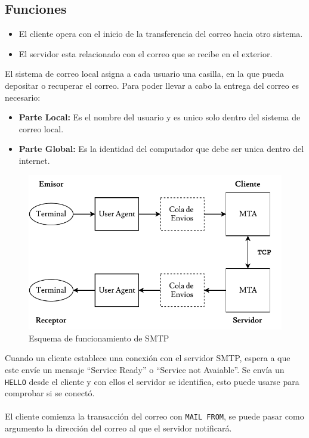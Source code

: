 \subsection*{Funciones}
\begin{itemize}
\item El cliente opera con el inicio de la transferencia del correo hacia otro sistema.
\item El servidor esta relacionado con el correo que se recibe en el exterior.
\end{itemize}
El sistema de correo local asigna a cada usuario una casilla, en la que pueda depositar o recuperar el correo. Para poder llevar a cabo la entrega del correo es necesario:
\begin{itemize}
\item \textbf{Parte Local:} Es el nombre del usuario y es unico solo dentro del sistema de correo local.
\item \textbf{Parte Global:} Es la identidad del computador que debe ser unica dentro del internet.
\end{itemize}
\begin{figure}[H]
\centering
\includegraphics[page=1,scale=0.7]{SMTP.pdf}
\caption{Esquema de funcionamiento de SMTP}
\end{figure}
Cuando un cliente establece una conexión con el servidor SMTP, espera a que este envíe un mensaje ``Service Ready'' o ``Service not Avaiable''. Se envía un \texttt{HELLO} desde el cliente y con ellos el servidor se identifica, esto puede usarse para comprobar si se conectó. \\${ }$\\
El cliente comienza la transacción del correo con \texttt{MAIL FROM}, se puede pasar como argumento la dirección del correo al que el servidor notificará. \\${ }$\\
